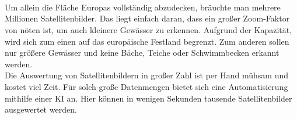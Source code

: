 %
\\
\\
\\
Um allein die Fläche Europas vollständig abzudecken, bräuchte man mehrere Millionen Satellitenbilder.
Das liegt einfach daran, dass ein großer Zoom-Faktor von nöten ist, um auch kleinere Gewässer zu erkennen.
Aufgrund der Kapazität, wird sich zum einen auf das europäische Festland begrenzt.
Zum anderen sollen nur größere Gewässer und keine Bäche, Teiche oder Schwimmbecken erkannt werden.
\\
Die Auswertung von Satellitenbildern in großer Zahl ist per Hand mühsam und kostet viel Zeit.
Für solch große Datenmengen bietet sich eine Automatisierung mithilfe einer KI an.
Hier können in wenigen Sekunden tausende Satellitenbilder ausgewertet werden.